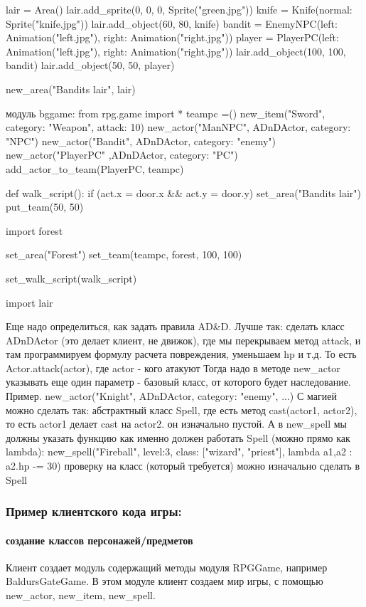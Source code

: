 lair = Area()
lair.add\_sprite(0, 0, 0, Sprite("green.jpg"))
knife = Knife(normal: Sprite("knife.jpg"))
lair.add\_object(60, 80, knife)
bandit = EnemyNPC(left: Animation("left.jpg"), right: Animation("right.jpg"))
player = PlayerPC(left: Animation("left.jpg"), right: Animation("right.jpg"))
lair.add\_object(100, 100, bandit)
lair.add\_object(50, 50, player)

new\_area("Bandits lair", lair)

модуль bggame:
from rpg.game import *
teampc =()
new\_item("Sword", category: "Weapon", attack: 10)
new\_actor("ManNPC",  ADnDActor, category: "NPC")
new\_actor("Bandit",  ADnDActor, category: "enemy")
new\_actor("PlayerPC" ,ADnDActor, category: "PC")
add\_actor\_to\_team(PlayerPC, teampc)

def walk\_script():
	if (act.x = door.x \&\& act.y = door.y)
		set\_area("Bandits lair")
		put\_team(50, 50)

import forest

set\_area("Forest")
set\_team(teampc, forest, 100, 100)


set\_walk\_script(walk\_script)

import lair


Еще надо определиться, как задать правила AD\&D.
Лучше так: сделать класс ADnDActor (это делает клиент, не движок), где мы перекрываем метод attack, и там программируем формулу расчета повреждения, уменьшаем hp и т.д.
То есть Actor.attack(actor), где actor - кого атакуют
Тогда надо в методе new\_actor указывать еще один параметр - базовый класс, от которого будет наследование.
Пример.
new\_actor("Knight", ADnDActor, category: "enemy", ...)
С магией можно сделать так:
абстрактный класс Spell, где есть метод cast(actor1, actor2), то есть actor1 делает cast на actor2. он изначально пустой. А в new\_spell мы должны указать функцию как именно должен работать Spell (можно прямо как lambda):
new\_spell("Fireball", level:3, class: ["wizard", "priest"], lambda a1,a2 : a2.hp -= 30)
проверку на класс (который требуется) можно изначально сделать в Spell


\subsubsection{Пример клиентского кода игры:}
\paragraph{создание классов персонажей/предметов}
Клиент создает модуль содержащий методы модуля RPGGame, например BaldursGateGame. В этом модуле клиент создаем мир игры, с помощью new\_actor, new\_item, new\_spell. 

